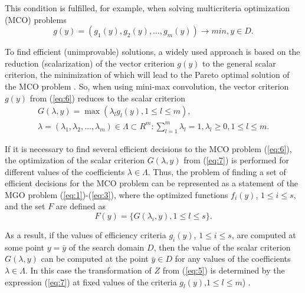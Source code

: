 \documentclass[review]{elsarticle}
\begin{document}
This condition is fulfilled, for example, when solving multicriteria optimization (MCO) problems 
\begin{equation}\label{eq:6}
g(y) = (g_1(y), g_2(y), \dots , g_m(y)) \to min,  y\in D.
\end{equation}

To find efficient (unimprovable) solutions, a widely used approach is based on the reduction (scalarization) of the vector criterion $g(y)$ to the general scalar criterion, the minimization of which will lead to the Pareto optimal solution of the MCO problem \cite{c29,c30,c31,c32,c33}. So, when using mini-max convolution, the vector criterion $g(y)$ from (\ref{eq:6}) reduces to the scalar criterion
\begin{equation}\label{eq:7}
\begin{matrix}
G(\lambda,y)=\max{(\lambda_l g_l(y),1 \leq l \leq m)},	\\
\lambda=(\lambda_1,\lambda_2,\dots,\lambda_m)\in \Lambda \subset R^m:\sum_{l=1}^m{\lambda_l =1},\lambda_l\geq 0,1 \leq l \leq m.
\end{matrix}
\end{equation}


If it is necessary to find several efficient decisions to the MCO problem (\ref{eq:6}), the optimization of the scalar criterion $G(\lambda,y)$ from (\ref{eq:7}) is performed for different values of the coefficients $\lambda \in \Lambda$. Thus, the problem of finding a set of efficient decisions for the MCO problem can be represented as a statement of the MGO problem (\ref{eq:1})-(\ref{eq:3}), where the optimized functions $f_i(y)$, $1 \leq i \leq s$, and the set $F$ are defined as
\begin{equation}\label{eq:8}
F(y)= \{ G(\lambda_i,y),1 \leq l \leq s\}.
\end{equation}

As a result, if the values of efficiency criteria $g_i(y)$, $1 \leq i \leq s$, are computed at some point $y=\bar{y}$ of the search domain $D$, then the value of the scalar criterion $G(\lambda,y)$ can be computed at the point $\bar{y} \in D$ for any values of the coefficients $\lambda \in \Lambda$. In this case the transformation of $Z$ from (\ref{eq:5}) is determined by the expression (\ref{eq:7}) at fixed values of the criteria $g_l (y)$,$1 \leq l \leq m$) \cite{c27,c28}.
\end{document}
